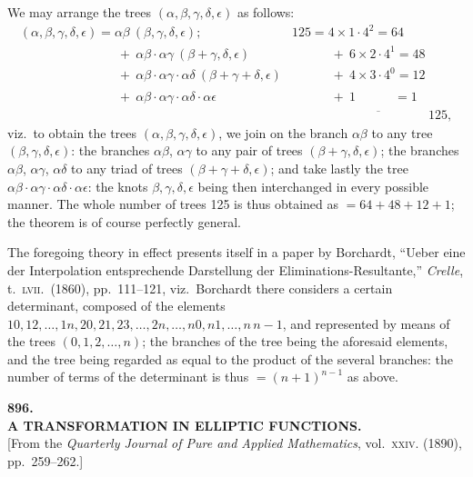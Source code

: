 \documentclass[11pt,a4paper]{article}
\begin{document}
We may arrange the trees $(\alpha, \beta, \gamma, \delta, \epsilon)$ as follows:
\[
\begin{array}{ll}
(\alpha, \beta, \gamma, \delta, \epsilon) = \alpha\beta\ (\beta, \gamma, \delta, \epsilon); & 125 = 4 \times 1 \cdot 4^2 = 64 \\
\phantom{(\alpha, \beta, \gamma, \delta, \epsilon) =}\ +\ \alpha\beta \cdot \alpha\gamma\ (\beta + \gamma, \delta, \epsilon) & \phantom{125 =}\ +\ 6 \times 2 \cdot 4^1 = 48 \\
\phantom{(\alpha, \beta, \gamma, \delta, \epsilon) =}\ +\ \alpha\beta \cdot \alpha\gamma \cdot \alpha\delta\ (\beta + \gamma + \delta, \epsilon) & \phantom{125 =}\ +\ 4 \times 3 \cdot 4^0 = 12 \\
\phantom{(\alpha, \beta, \gamma, \delta, \epsilon) =}\ +\ \alpha\beta \cdot \alpha\gamma \cdot \alpha\delta \cdot \alpha\epsilon & \phantom{125 =}\ +\ 1\phantom{ \times 1 \cdot 4^0\ } = 1 \\
& \phantom{125 =}\ \overline{\phantom{xxxxxxxxxxxxx}}\ 125,
\end{array}
\]
viz.\ to obtain the trees $(\alpha, \beta, \gamma, \delta, \epsilon)$, we join on the branch $\alpha\beta$ to any tree $(\beta, \gamma, \delta, \epsilon)$: the branches $\alpha\beta$, $\alpha\gamma$ to any pair of trees $(\beta + \gamma, \delta, \epsilon)$; the branches $\alpha\beta$, $\alpha\gamma$, $\alpha\delta$ to any triad of trees $(\beta + \gamma + \delta, \epsilon)$; and take lastly the tree $\alpha\beta \cdot \alpha\gamma \cdot \alpha\delta \cdot \alpha\epsilon$: the knots $\beta, \gamma, \delta, \epsilon$ being then interchanged in every possible manner. The whole number of trees 125 is thus obtained as $= 64 + 48 + 12 + 1$; the theorem is of course perfectly general.

\smallskip
The foregoing theory in effect presents itself in a paper by Borchardt, ``Ueber eine der Interpolation entsprechende Darstellung der Eliminations-Resultante,'' \emph{Crelle}, t.\ \textsc{lvii}.\ (1860), pp.\ 111--121, viz.\ Borchardt there considers a certain determinant, composed of the elements $10, 12, \ldots, 1n, 20, 21, 23, \ldots, 2n, \ldots, n0, n1, \ldots, n\,n{-}1$, and represented by means of the trees $(0, 1, 2, \ldots, n)$; the branches of the tree being the aforesaid elements, and the tree being regarded as equal to the product of the several branches: the number of terms of the determinant is thus $= (n + 1)^{n-1}$ as above.

\bigskip

\clearpage
\begin{center}
{\large\bfseries 896.}\\[0.5em]
{\large\bfseries A TRANSFORMATION IN ELLIPTIC FUNCTIONS.}\\[0.5em]
\small [From the \emph{Quarterly Journal of Pure and Applied Mathematics}, vol.\ \textsc{xxiv}. (1890), pp.\ 259--262.]
\end{center}
\medskip
\end{document}
